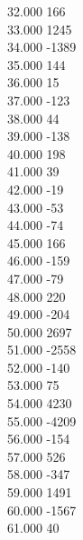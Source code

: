 { 32.000	166 \\
 33.000	1245 \\
 34.000	-1389 \\
 35.000	144 \\
 36.000	15 \\
 37.000	-123 \\
 38.000	44 \\
 39.000	-138 \\
 40.000	198 \\
 41.000	39 \\
 42.000	-19 \\
 43.000	-53 \\
 44.000	-74 \\
 45.000	166 \\
 46.000	-159 \\
 47.000	-79 \\
 48.000	220 \\
 49.000	-204 \\
 50.000	2697 \\
 51.000	-2558 \\
 52.000	-140 \\
 53.000	75 \\
 54.000	4230 \\
 55.000	-4209 \\
 56.000	-154 \\
 57.000	526 \\
 58.000	-347 \\
 59.000	1491 \\
 60.000	-1567 \\
 61.000	40 \\
}
